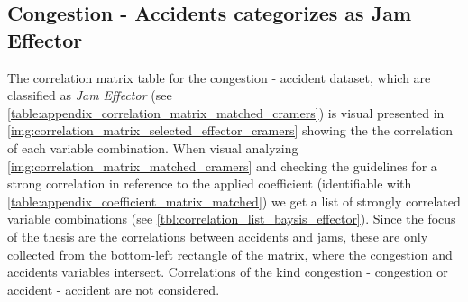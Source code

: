 \subsection{Congestion - Accidents categorizes as Jam Effector}
\label{analysis_processing_correlation_baysis_effector}
The correlation matrix table for the congestion - accident dataset, which are classified as \textit{Jam Effector} (see \cref{table:appendix_correlation_matrix_matched_cramers}) is visual presented in \cref{img:correlation_matrix_selected_effector_cramers} showing the the correlation of each variable combination. When visual analyzing \cref{img:correlation_matrix_matched_cramers} and checking the guidelines for a strong correlation in reference to the applied coefficient (identifiable with \cref{table:appendix_coefficient_matrix_matched}) we get a list of strongly correlated variable combinations (see \cref{tbl:correlation_list_baysis_effector}). Since the focus of the thesis are the correlations between accidents and jams, these are only collected from the bottom-left rectangle of the matrix, where the congestion and accidents variables intersect. Correlations of the kind congestion - congestion or accident - accident are not considered.
